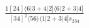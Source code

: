 \documentclass[varwidth, border=5pt]{standalone}
\begin{document}
\begin{my}
$\begin{gathered}
\scriptscriptstyle\frac{1[24]⟨6|3+4|2]⟨6|2+3|4]}{[34]^2⟨56⟩⟨1|2+3|4]s_{234}}
\end{gathered}$
\end{my}
\end{document}
